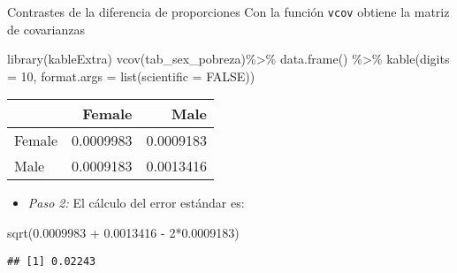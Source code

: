 \documentclass[
  ignorenonframetext,
]{beamer}
\newenvironment{Shaded}{\begin{snugshade}}{\end{snugshade}}
\newcommand{\AttributeTok}[1]{\textcolor[rgb]{0.77,0.63,0.00}{#1}}
\newcommand{\ConstantTok}[1]{\textcolor[rgb]{0.00,0.00,0.00}{#1}}
\newcommand{\DecValTok}[1]{\textcolor[rgb]{0.00,0.00,0.81}{#1}}
\newcommand{\FloatTok}[1]{\textcolor[rgb]{0.00,0.00,0.81}{#1}}
\newcommand{\FunctionTok}[1]{\textcolor[rgb]{0.00,0.00,0.00}{#1}}
\newcommand{\NormalTok}[1]{#1}
\newcommand{\SpecialCharTok}[1]{\textcolor[rgb]{0.00,0.00,0.00}{#1}}
\providecommand{\tightlist}{%
  \setlength{\itemsep}{0pt}\setlength{\parskip}{0pt}}
\begin{document}
\begin{frame}[fragile]{Contrastes de la diferencia de proporciones}
\protect\hypertarget{contrastes-de-la-diferencia-de-proporciones}{}
Con la función \texttt{vcov} obtiene la matriz de covarianzas

\begin{Shaded}
\begin{Highlighting}[]
\FunctionTok{library}\NormalTok{(kableExtra)}
\FunctionTok{vcov}\NormalTok{(tab\_sex\_pobreza)}\SpecialCharTok{\%\textgreater{}\%} \FunctionTok{data.frame}\NormalTok{() }\SpecialCharTok{\%\textgreater{}\%} 
  \FunctionTok{kable}\NormalTok{(}\AttributeTok{digits =} \DecValTok{10}\NormalTok{,}
        \AttributeTok{format.args =} \FunctionTok{list}\NormalTok{(}\AttributeTok{scientific =} \ConstantTok{FALSE}\NormalTok{))}
\end{Highlighting}
\end{Shaded}

\begin{tabular}{l|r|r}
\hline
  & Female & Male\\
\hline
Female & 0.0009983 & 0.0009183\\
\hline
Male & 0.0009183 & 0.0013416\\
\hline
\end{tabular}

\begin{itemize}[<+->]
\tightlist
\item
  \emph{Paso 2:} El cálculo del error estándar es:
\end{itemize}

\begin{Shaded}
\begin{Highlighting}[]
\FunctionTok{sqrt}\NormalTok{(}\FloatTok{0.0009983} \SpecialCharTok{+} \FloatTok{0.0013416} \SpecialCharTok{{-}} \DecValTok{2}\SpecialCharTok{*}\FloatTok{0.0009183}\NormalTok{)}
\end{Highlighting}
\end{Shaded}

\begin{verbatim}
## [1] 0.02243
\end{verbatim}
\end{frame}
\end{document}

